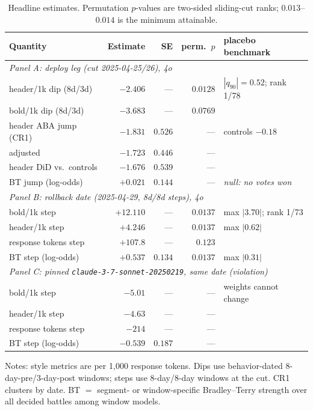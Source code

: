 \documentclass[11pt]{article}
\begin{document}
\begin{table}[t]
\centering
\small
\caption{Headline estimates. Permutation $p$-values are two-sided sliding-cut
ranks; $0.013$--$0.014$ is the minimum attainable.}
\label{tab:main}
\begin{tabular}{lrrrl}
\toprule
Quantity & Estimate & SE & perm.\ $p$ & placebo benchmark \\
\midrule
\multicolumn{5}{l}{\emph{Panel A: deploy leg (cut 2025-04-25/26), 4o}}\\
header/1k dip (8d/3d)        & $-2.406$ & ---     & $0.0128$ & $|q_{90}|=0.52$; rank 1/78 \\
bold/1k dip (8d/3d)          & $-3.683$ & ---     & $0.0769$ & \\
header ABA jump (CR1)        & $-1.831$ & $0.526$ & ---      & controls $-0.18$ \\
\quad adjusted               & $-1.723$ & $0.446$ & ---      & \\
header DiD vs.\ controls     & $-1.676$ & $0.539$ & ---      & \\
BT jump (log-odds)           & $+0.021$ & $0.144$ & ---      & \emph{null: no votes won} \\
\midrule
\multicolumn{5}{l}{\emph{Panel B: rollback date (2025-04-29, 8d/8d steps), 4o}}\\
bold/1k step                 & $+12.110$ & ---    & $0.0137$ & max $|3.70|$; rank 1/73 \\
header/1k step               & $+4.246$  & ---    & $0.0137$ & max $|0.62|$ \\
response tokens step         & $+107.8$  & ---    & $0.123$  & \\
BT step (log-odds)           & $+0.537$  & $0.134$ & $0.0137$ & max $|0.31|$ \\
\midrule
\multicolumn{5}{l}{\emph{Panel C: pinned \texttt{claude-3-7-sonnet-20250219}, same date (violation)}}\\
bold/1k step                 & $-5.01$  & ---     & ---      & weights cannot change \\
header/1k step               & $-4.63$  & ---     & ---      & \\
response tokens step         & $-214$   & ---     & ---      & \\
BT step (log-odds)           & $-0.539$ & $0.187$ & ---      & \\
\bottomrule
\end{tabular}

\medskip
\parbox{0.92\textwidth}{\footnotesize Notes: style metrics are per 1{,}000
response tokens. Dips use behavior-dated 8-day-pre/3-day-post windows; steps
use 8-day/8-day windows at the cut. CR1 clusters by date. BT $=$ segment- or
window-specific Bradley--Terry strength over all decided battles among
window models.}
\end{table}
\end{document}

